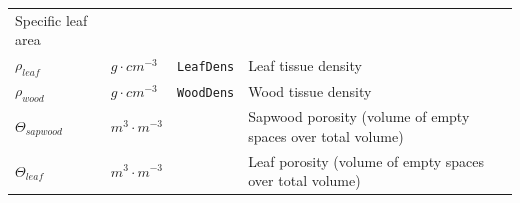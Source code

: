 \documentclass[]{book}
\begin{document}
\begin{longtable}[]{@{}llll@{}}
\begin{minipage}[t]{0.45\columnwidth}
Specific leaf area\strut
\end{minipage}\tabularnewline
\begin{minipage}[t]{0.11\columnwidth}\raggedright
\(\rho_{leaf}\)\strut
\end{minipage} & \begin{minipage}[t]{0.10\columnwidth}\raggedright
\(g \cdot cm^{-3}\)\strut
\end{minipage} & \begin{minipage}[t]{0.12\columnwidth}\raggedright
\texttt{LeafDens}\strut
\end{minipage} & \begin{minipage}[t]{0.45\columnwidth}\raggedright
Leaf tissue density\strut
\end{minipage}\tabularnewline
\begin{minipage}[t]{0.11\columnwidth}\raggedright
\(\rho_{wood}\)\strut
\end{minipage} & \begin{minipage}[t]{0.10\columnwidth}\raggedright
\(g \cdot cm^{-3}\)\strut
\end{minipage} & \begin{minipage}[t]{0.12\columnwidth}\raggedright
\texttt{WoodDens}\strut
\end{minipage} & \begin{minipage}[t]{0.45\columnwidth}\raggedright
Wood tissue density\strut
\end{minipage}\tabularnewline
\begin{minipage}[t]{0.11\columnwidth}\raggedright
\(\Theta_{sapwood}\)\strut
\end{minipage} & \begin{minipage}[t]{0.10\columnwidth}\raggedright
\(m^3 \cdot m^{-3}\)\strut
\end{minipage} & \begin{minipage}[t]{0.12\columnwidth}\raggedright
\strut
\end{minipage} & \begin{minipage}[t]{0.45\columnwidth}\raggedright
Sapwood porosity (volume of empty spaces over total volume)\strut
\end{minipage}\tabularnewline
\begin{minipage}[t]{0.11\columnwidth}\raggedright
\(\Theta_{leaf}\)\strut
\end{minipage} & \begin{minipage}[t]{0.10\columnwidth}\raggedright
\(m^3 \cdot m^{-3}\)\strut
\end{minipage} & \begin{minipage}[t]{0.12\columnwidth}\raggedright
\strut
\end{minipage} & \begin{minipage}[t]{0.45\columnwidth}\raggedright
Leaf porosity (volume of empty spaces over total volume)\strut
\end{minipage}\tabularnewline
\bottomrule
\end{longtable}
\end{document}
